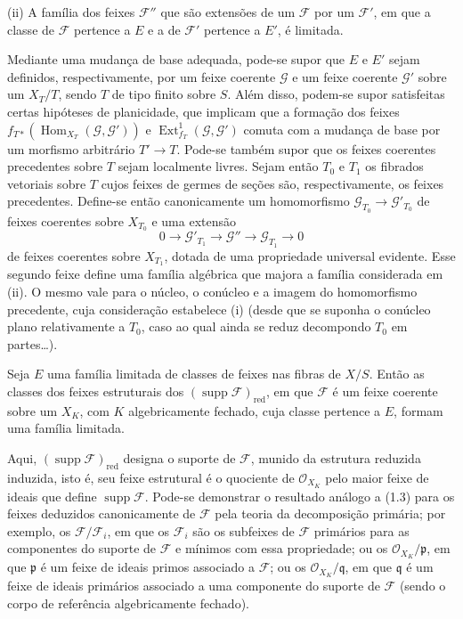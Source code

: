 \smallskip
\noindent (ii) A família dos feixes $\mathcal F''$ que são extensões de um
$\mathcal F$ por um $\mathcal F'$, em que a classe de $\mathcal F$ pertence
a $E$ e a de $\mathcal F'$ pertence a $E'$, é limitada.

Mediante uma mudança de base adequada, pode-se supor que $E$ e $E'$ sejam
definidos, respectivamente, por um feixe coerente $\mathcal G$ e um feixe
coerente $\mathcal G'$ sobre um $X_T/T$, sendo $T$ de tipo finito sobre $S$.
Além disso, podem-se supor satisfeitas certas hipóteses de planicidade, que
implicam que a formação dos feixes
$f_{T*}(\operatorname{Hom}_{X_T}(\mathcal G,\mathcal G'))$ e
$\operatorname{Ext}^{1}_{f_T}(\mathcal G,\mathcal G')$ comuta com a mudança
de base por um morfismo arbitrário $T'\longrightarrow T$. Pode-se também
supor que os feixes coerentes precedentes sobre $T$ sejam localmente livres.
Sejam então $T_0$ e $T_1$ os fibrados vetoriais sobre $T$ cujos feixes de
germes de seções são, respectivamente, os feixes precedentes. Define-se então
canonicamente um homomorfismo
$\mathcal G_{T_0}\longrightarrow\mathcal G'_{T_0}$ de feixes coerentes sobre
$X_{T_0}$ e uma extensão
\[
0\longrightarrow\mathcal G'_{T_1}\longrightarrow\mathcal G''
\longrightarrow\mathcal G_{T_1}\longrightarrow0
\]
de feixes coerentes sobre $X_{T_1}$, dotada de uma propriedade universal
evidente. Esse segundo feixe define uma família algébrica que majora a família
considerada em (ii). O mesmo vale para o núcleo, o conúcleo e a imagem do
homomorfismo
precedente, cuja consideração estabelece (i) (desde que se suponha o conúcleo
plano relativamente a $T_0$, caso ao qual ainda se reduz decompondo $T_0$ em
partes\ldots).

 Seja $E$ uma família limitada de classes de feixes
nas fibras de $X/S$. Então as classes dos feixes estruturais dos
$(\operatorname{supp}\mathcal F)_{\mathrm{red}}$, em que $\mathcal F$ é um
feixe coerente sobre um $X_K$, com $K$ algebricamente fechado, cuja classe
pertence a $E$, formam uma família limitada.

Aqui, $(\operatorname{supp}\mathcal F)_{\mathrm{red}}$ designa o suporte de
$\mathcal F$, munido da estrutura reduzida induzida, isto é, seu feixe
estrutural é o quociente de $\mathcal O_{X_K}$ pelo maior feixe de ideais que
define $\operatorname{supp}\mathcal F$. Pode-se demonstrar o resultado
análogo a (1.3) para os feixes deduzidos canonicamente de $\mathcal F$ pela
teoria da decomposição primária; por exemplo, os
$\mathcal F/\mathcal F_i$, em que os $\mathcal F_i$ são os subfeixes de
$\mathcal F$ primários para as componentes do suporte de $\mathcal F$ e
mínimos com essa propriedade; ou os $\mathcal O_{X_K}/\mathfrak p$, em que
$\mathfrak p$ é um feixe de ideais primos associado a $\mathcal F$; ou os
$\mathcal O_{X_K}/\mathfrak q$, em que $\mathfrak q$ é um feixe de ideais
primários associado a uma componente do suporte de $\mathcal F$ (sendo o
corpo de referência algebricamente fechado).

